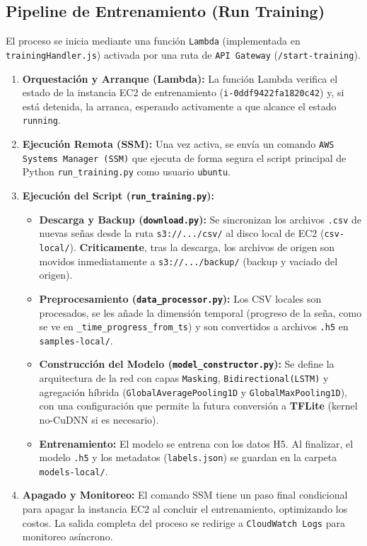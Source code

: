 \subsection{Pipeline de Entrenamiento (Run Training)}
El proceso se inicia mediante una función \texttt{Lambda} (implementada en \texttt{trainingHandler.js}) activada por una ruta de \texttt{API Gateway} (\texttt{/start-training}).

\begin{enumerate}
    \item \textbf{Orquestación y Arranque (Lambda):} La función Lambda verifica el estado de la instancia EC2 de entrenamiento (\texttt{i-0ddf9422fa1820c42}) y, si está detenida, la arranca, esperando activamente a que alcance el estado \texttt{running}.
    \item \textbf{Ejecución Remota (SSM):} Una vez activa, se envía un comando \texttt{AWS Systems Manager (SSM)} que ejecuta de forma segura el script principal de Python \texttt{run\_training.py} como usuario \texttt{ubuntu}.
    \item \textbf{Ejecución del Script (\texttt{run\_training.py}):}
    \begin{itemize}
        \item \textbf{Descarga y Backup (\texttt{download.py}):} Se sincronizan los archivos \texttt{.csv} de nuevas señas desde la ruta \texttt{s3://.../csv/} al disco local de EC2 (\texttt{csv-local/}). \textbf{Criticamente}, tras la descarga, los archivos de origen son movidos inmediatamente a \texttt{s3://.../backup/} (backup y vaciado del origen).
        \item \textbf{Preprocesamiento (\texttt{data\_processor.py}):} Los CSV locales son procesados, se les añade la dimensión temporal (progreso de la seña, como se ve en \texttt{\_time\_progress\_from\_ts}) y son convertidos a archivos \texttt{.h5} en \texttt{samples-local/}.
        \item \textbf{Construcción del Modelo (\texttt{model\_constructor.py}):} Se define la arquitectura de la red con capas \texttt{Masking}, \texttt{Bidirectional(LSTM)} y agregación híbrida (\texttt{GlobalAveragePooling1D} y \texttt{GlobalMaxPooling1D}), con una configuración que permite la futura conversión a \textbf{TFLite} (kernel no-CuDNN si es necesario).
        \item \textbf{Entrenamiento:} El modelo se entrena con los datos H5. Al finalizar, el modelo \texttt{.h5} y los metadatos (\texttt{labels.json}) se guardan en la carpeta \texttt{models-local/}.
    \end{itemize}
    \item \textbf{Apagado y Monitoreo:} El comando SSM tiene un paso final condicional para apagar la instancia EC2 al concluir el entrenamiento, optimizando los costos. La salida completa del proceso se redirige a \texttt{CloudWatch Logs} para monitoreo asíncrono.
\end{enumerate}

